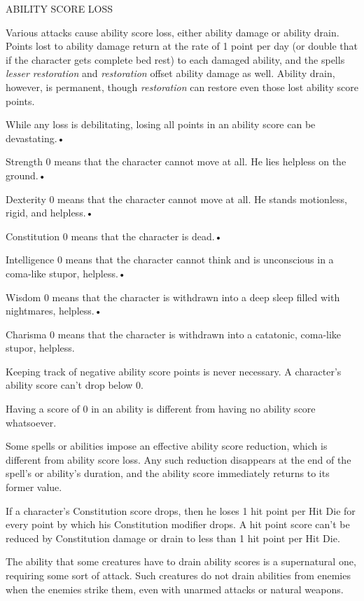 \documentclass{article}
\begin{document}
\vspace{12pt}
ABILITY SCORE LOSS

Various attacks cause ability score loss, either ability damage or ability drain. 
Points lost to ability damage return at the rate of 1 point per day (or double 
that if the character gets complete bed rest) to each damaged ability, and the 
spells \textit{lesser restoration }and \textit{restoration }offset ability damage 
as well. Ability drain, however, is permanent, though \textit{restoration }can 
restore even those lost ability score points.

While any loss is debilitating, losing all points in an ability score can be devastating.• 

\parindent=3pt
Strength 0 means that the character cannot move at all. He lies helpless on the 
ground.• 

Dexterity 0 means that the character cannot move at all. He stands motionless, 
rigid, and helpless.• 

\parindent=7pt
Constitution 0 means that the character is dead.• 

\parindent=3pt
Intelligence 0 means that the character cannot think and is unconscious in a coma-like 
stupor, helpless.• 

Wisdom 0 means that the character is withdrawn into a deep sleep filled with nightmares, 
helpless.• 

\parindent=7pt
Charisma 0 means that the character is withdrawn into a catatonic, coma-like stupor, 
helpless.

\parindent=0pt
Keeping track of negative ability score points is never necessary. A character's 
ability score can't drop below 0.

Having a score of 0 in an ability is different from having no ability score whatsoever.

Some spells or abilities impose an effective ability score reduction, which is 
different from ability score loss. Any such reduction disappears at the end of 
the spell's or ability's duration, and the ability score immediately returns to 
its former value.

If a character's Constitution score drops, then he loses 1 hit point per Hit Die 
for every point by which his Constitution modifier drops. A hit point score can't 
be reduced by Constitution damage or drain to less than 1 hit point per Hit Die.

The ability that some creatures have to drain ability scores is a supernatural 
one, requiring some sort of attack. Such creatures do not drain abilities from 
enemies when the enemies strike them, even with unarmed attacks or natural weapons.
\end{document}
